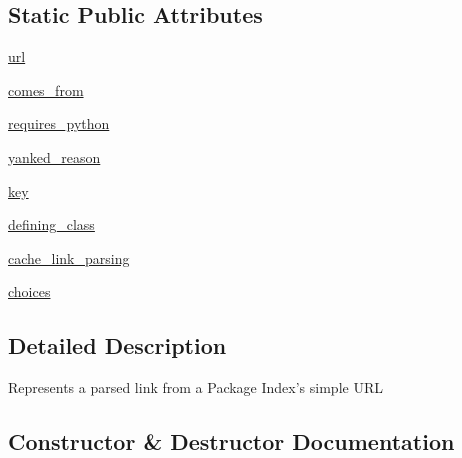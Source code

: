 \subsection*{Static Public Attributes}
\begin{DoxyCompactItemize}
\item 
\hyperlink{classpip_1_1__internal_1_1models_1_1link_1_1Link_af67004cdb29d12b7420984c694262af3}{url}
\item 
\hyperlink{classpip_1_1__internal_1_1models_1_1link_1_1Link_aed0fb4d4320bf51a309c719ef452ec7f}{comes\+\_\+from}
\item 
\hyperlink{classpip_1_1__internal_1_1models_1_1link_1_1Link_afbf7631c356c23c439f39b35407161dd}{requires\+\_\+python}
\item 
\hyperlink{classpip_1_1__internal_1_1models_1_1link_1_1Link_af68edcd6a5a6f4c22ea34802fbd83e9c}{yanked\+\_\+reason}
\item 
\hyperlink{classpip_1_1__internal_1_1models_1_1link_1_1Link_a2e7bc512b5d82b6b89e7992150e2f76e}{key}
\item 
\hyperlink{classpip_1_1__internal_1_1models_1_1link_1_1Link_a5464e236ff67861728d8d60f02432b83}{defining\+\_\+class}
\item 
\hyperlink{classpip_1_1__internal_1_1models_1_1link_1_1Link_a67c7b7d876a4d8531d504aca2238202e}{cache\+\_\+link\+\_\+parsing}
\item 
\hyperlink{classpip_1_1__internal_1_1models_1_1link_1_1Link_a92cd0a415f11f5cb9f77c939c8e87c83}{choices}
\end{DoxyCompactItemize}


\subsection{Detailed Description}
\begin{DoxyVerb}Represents a parsed link from a Package Index's simple URL
\end{DoxyVerb}
 

\subsection{Constructor \& Destructor Documentation}
\mbox{\label{classpip_1_1__internal_1_1models_1_1link_1_1Link_a12a3ebf030fc24233dd1e55a1b224377}} 
